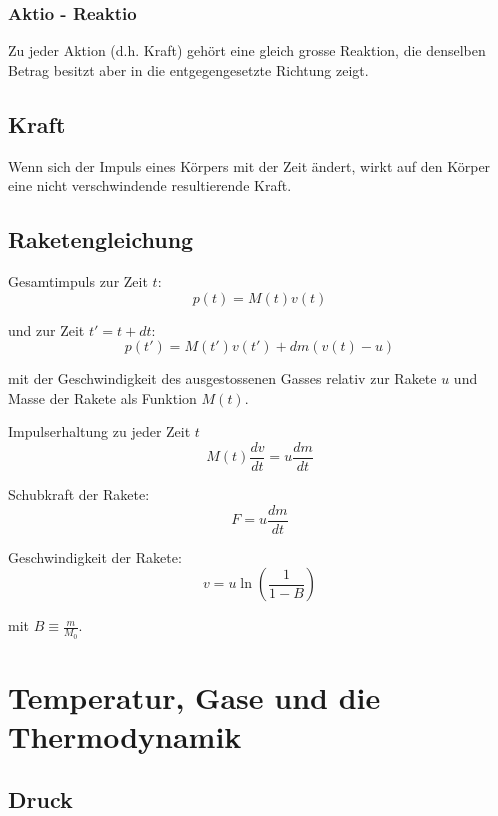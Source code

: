 \documentclass[11pt]{article}
\begin{document}
\subsubsection{Aktio - Reaktio}
 Zu jeder Aktion (d.h. Kraft) geh{\"o}rt eine gleich grosse Reaktion, die denselben Betrag besitzt aber in die entgegengesetzte Richtung zeigt.

\subsection{Kraft}
Wenn sich der Impuls eines K{\"o}rpers mit der Zeit {\"a}ndert, wirkt auf den K{\"o}rper eine nicht verschwindende resultierende Kraft.

\subsection{Raketengleichung}
Gesamtimpuls zur Zeit $t$:
\begin{equation*}
	p(t) = M(t)v(t)
\end{equation*}

und zur Zeit $t' = t + dt$:
\begin{equation*}
	p(t') = M(t')v(t') + dm(v(t) - u)
\end{equation*}

mit der Geschwindigkeit des ausgestossenen Gasses relativ zur Rakete $u$ und Masse der Rakete als Funktion $M(t)$. \newline

Impulserhaltung zu jeder Zeit $t$
\begin{equation*}
	M(t)\frac{dv}{dt} = u\frac{dm}{dt}
\end{equation*}

Schubkraft der Rakete:
\begin{equation*}
	F = u\frac{dm}{dt}
\end{equation*}

Geschwindigkeit der Rakete:
\begin{equation*}
	v = u \ln(\frac{1}{1-B})
\end{equation*}

mit $B\equiv\frac{m}{M_0}$.

\section{Temperatur, Gase und die Thermodynamik}

\subsection{Druck}
\end{document}

